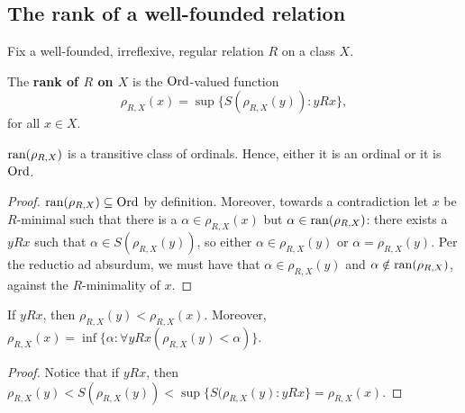 \documentclass[twoside,openright,titlepage,numbers=noenddot,%
               headinclude,footinclude,cleardoublepage=empty,abstract=on,
               BCOR=23mm,paper=letter,fontsize=11pt
               ]{scrreprt}
\begin{document}
\subsection{The rank of a well-founded relation}
Fix a well-founded, irreflexive, regular relation $R$ on a class $X$.
\begin{definition}
    The \textbf{rank of $R$ on $X$} is the $\mathrm{Ord}$-valued function
    \[ \rho_{R,X}(x) = \sup \{ S(\rho_{R,X}(y)): y R x \},\]
    for all $x \in X$.
\end{definition}
\begin{proposition}
    $\mathrm{ran}(\rho_{R,X})$ is a transitive class of ordinals. Hence, either it is an ordinal or it is $\mathrm{Ord}$.
\end{proposition}
\begin{proof}
    $\mathrm{ran}(\rho_{R,X}) \subseteq \mathrm{Ord}$ by definition. Moreover, towards a contradiction let $x$ be $R$-minimal such that there is a $\alpha \in \rho_{R,X}(x)$ but $\alpha \in \mathrm{ran}(\rho_{R,X})$: there exists a $y R x$ such that $\alpha \in S(\rho_{R,X}(y))$, so either $\alpha \in \rho_{R,X}(y)$ or $\alpha = \rho_{R,X}(y)$. Per the reductio ad absurdum, we must have that $\alpha \in \rho_{R,X}(y)$ and $\alpha \notin \mathrm{ran}(\rho_{R,X})$, against the $R$-minimality of $x$.
\end{proof}
\begin{proposition}
    If $y R x$, then $\rho_{R,X}(y) < \rho_{R,X}(x)$. Moreover, $\rho_{R,X}(x) = \inf\{\alpha: \forall y R x(\rho_{R,X}(y) < \alpha)\}$.
\end{proposition}
\begin{proof}
    Notice that if $y R x$, then $\rho_{R,X}(y) < S(\rho_{R,X}(y)) < \sup\{S(\rho_{R,X}(y): y R x\} = \rho_{R,X}(x)$. 
\end{proof}
\end{document}
